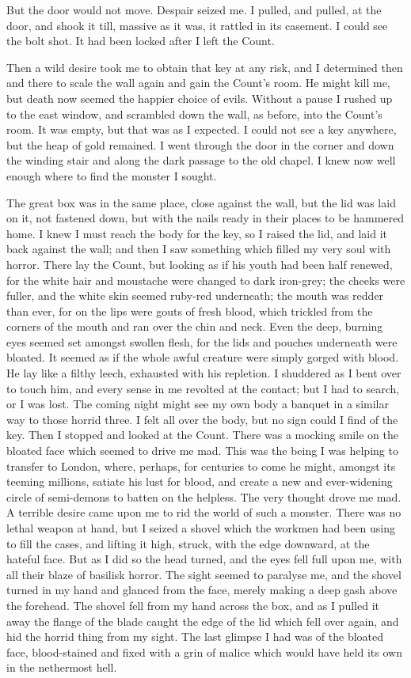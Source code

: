 \documentclass[12pt,openright]{book}
\begin{document}
But the door would not move. Despair seized me. I pulled, and pulled, at the door, and shook it till, massive as it was, it rattled in its casement. I could see the bolt shot. It had been locked after I left the Count.

Then a wild desire took me to obtain that key at any risk, and I determined then and there to scale the wall again and gain the Count’s room. He might kill me, but death now seemed the happier choice of evils. Without a pause I rushed up to the east window, and scrambled down the wall, as before, into the Count’s room. It was empty, but that was as I expected. I could not see a key anywhere, but the heap of gold remained. I went through the door in the corner and down the winding stair and along the dark passage to the old chapel. I knew now well enough where to find the monster I sought.

The great box was in the same place, close against the wall, but the lid was laid on it, not fastened down, but with the nails ready in their places to be hammered home. I knew I must reach the body for the key, so I raised the lid, and laid it back against the wall; and then I saw something which filled my very soul with horror. There lay the Count, but looking as if his youth had been half renewed, for the white hair and moustache were changed to dark iron-grey; the cheeks were fuller, and the white skin seemed ruby-red underneath; the mouth was redder than ever, for on the lips were gouts of fresh blood, which trickled from the corners of the mouth and ran over the chin and neck. Even the deep, burning eyes seemed set amongst swollen flesh, for the lids and pouches underneath were bloated. It seemed as if the whole awful creature were simply gorged with blood. He lay like a filthy leech, exhausted with his repletion. I shuddered as I bent over to touch him, and every sense in me revolted at the contact; but I had to search, or I was lost. The coming night might see my own body a banquet in a similar way to those horrid three. I felt all over the body, but no sign could I find of the key. Then I stopped and looked at the Count. There was a mocking smile on the bloated face which seemed to drive me mad. This was the being I was helping to transfer to London, where, perhaps, for centuries to come he might, amongst its teeming millions, satiate his lust for blood, and create a new and ever-widening circle of semi-demons to batten on the helpless. The very thought drove me mad. A terrible desire came upon me to rid the world of such a monster. There was no lethal weapon at hand, but I seized a shovel which the workmen had been using to fill the cases, and lifting it high, struck, with the edge downward, at the hateful face. But as I did so the head turned, and the eyes fell full upon me, with all their blaze of basilisk horror. The sight seemed to paralyse me, and the shovel turned in my hand and glanced from the face, merely making a deep gash above the forehead. The shovel fell from my hand across the box, and as I pulled it away the flange of the blade caught the edge of the lid which fell over again, and hid the horrid thing from my sight. The last glimpse I had was of the bloated face, blood-stained and fixed with a grin of malice which would have held its own in the nethermost hell.
\end{document}

